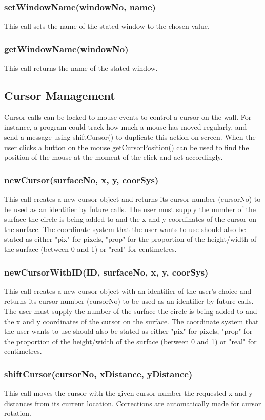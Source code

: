 \documentclass{acm_proc_article-sp}
\begin{document}
\subsubsection{setWindowName(windowNo, name)}
This call sets the name of the stated window to the chosen value.
\subsubsection{getWindowName(windowNo)}
This call returns the name of the stated window.
\subsection{Cursor Management}
Cursor calls can be locked to mouse events to control a cursor on the wall. For instance, a program could track how much a mouse has moved regularly, and send a message using shiftCursor() to duplicate this action on screen. When the user clicks a button on the mouse getCursorPosition() can be used to find the position of the mouse at the moment of the click and act accordingly.
\subsubsection{newCursor(surfaceNo, x, y, coorSys)}
This call creates a new cursor object and returns its cursor number (cursorNo) to be used as an identifier by future calls. The user must supply the number of the surface the circle is being added to and the x and y coordinates of the cursor on the surface. The coordinate system that the user wants to use should also be stated as either "pix" for pixels, "prop" for the proportion of the height/width of the surface (between 0 and 1) or "real" for centimetres.
\subsubsection{newCursorWithID(ID, surfaceNo, x, y, coorSys)}
This call creates a new cursor object with an identifier of the user's choice and returns its cursor number (cursorNo) to be used as an identifier by future calls. The user must supply the number of the surface the circle is being added to and the x and y coordinates of the cursor on the surface. The coordinate system that the user wants to use should also be stated as either "pix" for pixels, "prop" for the proportion of the height/width of the surface (between 0 and 1) or "real" for centimetres.
\subsubsection{shiftCursor(cursorNo, xDistance, yDistance)}
This call moves the cursor with the given cursor number the requested x and y distances from its current location. Corrections are automatically made for cursor rotation.
\end{document}
